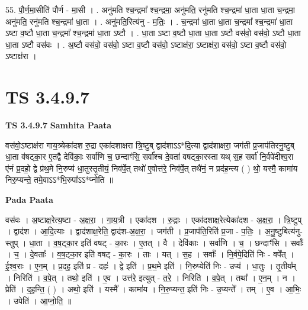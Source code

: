 \documentclass[17pt]{extarticle}
\begin{document}
55. पौ॒र्ण॒मा॒सीति॑ पौर्ण - मा॒सी । . अनु॑मति श्च॒न्द्रमा᳚ श्च॒न्द्रमा॒ अनु॑मति॒ रनु॑मति श्च॒न्द्रमा॑ धा॒ता धा॒ता च॒न्द्रमा॒ अनु॑मति॒ रनु॑मति श्च॒न्द्रमा॑ धा॒ता । . अनु॑मति॒रित्य॑नु - म॒तिः॒ । . च॒न्द्रमा॑ धा॒ता धा॒ता च॒न्द्रमा᳚ श्च॒न्द्रमा॑ धा॒ता ऽष्टा व॒ष्टौ धा॒ता च॒न्द्रमा᳚ श्च॒न्द्रमा॑ धा॒ता ऽष्टौ । . धा॒ता ऽष्टा व॒ष्टौ धा॒ता धा॒ता ऽष्टौ वस॑वो॒ वस॑वो॒ ऽष्टौ धा॒ता धा॒ता ऽष्टौ वस॑वः । . अ॒ष्टौ वस॑वो॒ वस॑वो॒ ऽष्टा व॒ष्टौ वस॑वो॒ ऽष्टाक्ष॑रा॒ ऽष्टाक्ष॑रा॒ वस॑वो॒ ऽष्टा व॒ष्टौ वस॑वो॒ ऽष्टाक्ष॑रा । \newline
\pagebreak
{}

\section{ TS 3.4.9.7 }

\textbf{TS 3.4.9.7 } \newline
\textbf{Samhita Paata} \newline

वस॑वो॒ऽष्टाक्ष॑रा गाय॒त्र्येका॑दश रु॒द्रा एका॑दशाक्षरा त्रि॒ष्टुब् द्वाद॑शाऽऽ*दि॒त्या द्वाद॑शाक्षरा॒ जग॑ती प्र॒जाप॑तिरनु॒ष्टुब् धा॒ता व॑षट्का॒र ए॒तद्वै देवि॑काः॒ सर्वा॑णि च॒ छन्दाꣳ॑सि॒ सर्वा᳚श्च दे॒वता॑ वषट्का॒रस्ता यथ् स॒ह सर्वा॑ नि॒र्वपे॑दीश्व॒रा ए॑नं प्र॒दहो॒ द्वे प्र॑थ॒मे नि॒रुप्य॑ धा॒तुस्तृ॒तीयं॒ निव॑र्पे॒त् तथो॑ ए॒वोत्त॑रे॒ निव॑र्पे॒त् तथै॑नं॒ न प्रद॑ह॒न्त्य ( ) थो॒ यस्मै॒ कामा॑य निरु॒प्यन्ते॒ तमे॒वाऽऽ*भि॒रुपा᳚ऽऽ*प्नोति ॥ \newline

\textbf{Pada Paata} \newline

वस॑वः । अ॒ष्टाक्ष॒रेत्य॒ष्टा - अ॒क्ष॒रा॒ । गा॒य॒त्री । एका॑दश । रु॒द्राः । एका॑दशाक्ष॒रेत्येका॑दश - अ॒क्ष॒रा॒ । त्रि॒ष्टुप् । द्वाद॑श । आ॒दि॒त्याः । द्वाद॑शाक्ष॒रेति॒ द्वाद॑श-अ॒क्ष॒रा॒ । जग॑ती । प्र॒जाप॑ति॒रिति॑ प्र॒जा - प॒तिः॒ । अ॒नु॒ष्टुबित्य॑नु-स्तुप् । धा॒ता । व॒ष॒ट्का॒र इति॑ वषट् - का॒रः । ए॒तत् । वै । देवि॑काः । सर्वा॑णि । च॒ । छन्दाꣳ॑सि । सर्वाः᳚ । च॒ । दे॒वताः᳚ । व॒ष॒ट्का॒र इति॑ वषट् - का॒रः । ताः । यत् । स॒ह । सर्वाः᳚ । नि॒र्वपे॒दिति॑ निः - वपे᳚त् । ई॒श्व॒राः । ए॒न॒म् । प्र॒दह॒ इति॑ प्र - दहः॑ । द्वे इति॑ । प्र॒थ॒मे इति॑ । नि॒रुप्येति॑ निः - उप्य॑ । धा॒तुः । तृ॒तीय᳚म् । निरिति॑ । व॒पे॒त् । तथो॒ इति॑ । ए॒व । उत्त॑रे॒ इत्युत् - त॒रे॒ । निरिति॑ । व॒पे॒त् । तथा᳚ । ए॒न॒म् । न । प्रेति॑ । द॒ह॒न्ति॒ ( ) । अथो॒ इति॑ । यस्मै᳚ । कामा॑य । नि॒रु॒प्यन्त॒ इति॑ निः - उ॒प्यन्ते᳚ । तम् । ए॒व । आ॒भिः॒ । उपेति॑ । आ॒प्नो॒ति॒ ॥  \newline
\end{document}
